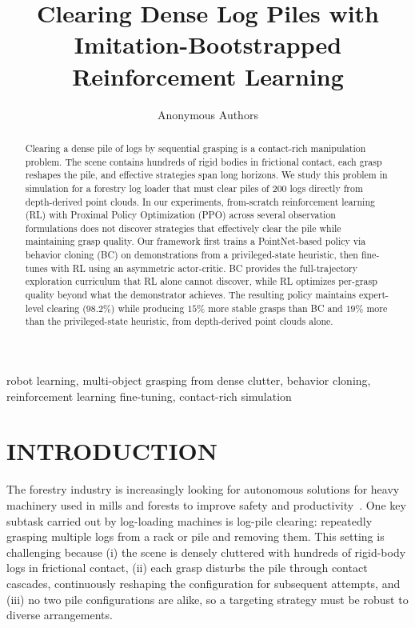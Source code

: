 \documentclass[letterpaper, 10 pt, conference]{ieeeconf}
\title{\LARGE \bf Clearing Dense Log Piles with Imitation-Bootstrapped Reinforcement Learning}
\author{
Anonymous Authors
}
\begin{document}
\maketitle
\thispagestyle{empty}
\pagestyle{empty}

\begin{abstract}
Clearing a dense pile of logs by sequential grasping is a contact-rich manipulation problem. The scene contains hundreds of rigid bodies in frictional contact, each grasp reshapes the pile, and effective strategies span long horizons.
We study this problem in simulation for a forestry log loader that must clear piles of 200 logs directly from depth-derived point clouds.
In our experiments, from-scratch reinforcement learning (RL) with Proximal Policy Optimization (PPO) across several observation formulations does not discover strategies that effectively clear the pile while maintaining grasp quality.
Our framework first trains a PointNet-based policy via behavior cloning (BC) on demonstrations from a privileged-state heuristic, then fine-tunes with RL using an asymmetric actor-critic.
BC provides the full-trajectory exploration curriculum that RL alone cannot discover, while RL optimizes per-grasp quality beyond what the demonstrator achieves.
The resulting policy maintains expert-level clearing ($98.2$\%) while producing $15$\% more stable grasps than BC and $19$\% more than the privileged-state heuristic, from depth-derived point clouds alone.
\end{abstract}

\begin{keywords}
robot learning, multi-object grasping from dense clutter, behavior cloning, reinforcement learning fine-tuning, contact-rich simulation
\end{keywords}

\section{INTRODUCTION}
The forestry industry is increasingly looking for autonomous solutions for heavy machinery used in mills and forests to improve safety and productivity~\cite{lindroos2015forestry}.
One key subtask carried out by log-loading machines is log-pile clearing: repeatedly grasping multiple logs from a rack or pile and removing them.
This setting is challenging because (i) the scene is densely cluttered with hundreds of rigid-body logs in frictional contact, (ii) each grasp disturbs the pile through contact cascades, continuously reshaping the configuration for subsequent attempts, and (iii) no two pile configurations are alike, so a targeting strategy must be robust to diverse arrangements.
\end{document}
